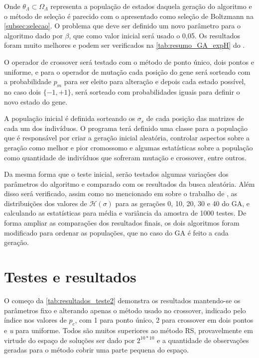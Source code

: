 Onde \(\theta_{\Lambda} \subset \Omega_{\Lambda} \) representa a população de estados daquela geração do algoritmo e o método de seleção é parecido com o apresentado como seleção de Boltzmann na \autoref{subsec:selecao}. O problema que deve ser definido um novo parâmetro para o algoritmo dado por \(\beta \), que como valor inicial será usado o 0,05. Os resultados foram muito melhores e podem ser verificados na \autoref{tab:resumo_GA_expH} do .

O operador de crossover será testado com o método de ponto único, dois pontos e uniforme, e para o operador de mutação cada posição do gene será sorteado com a probabilidade \(p_m\) para ser eleito para alteração e depois cada estado possível, no caso dois \(\{ -1, +1\}\), será sorteado com probabilidades iguais para definir o novo estado do gene.

A população inicial é definida sorteando os \(\sigma_s\) de cada posição das matrizes de cada um dos indivíduos. O programa terá definido uma classe para a população que é responsável por criar a geração inicial aleatória, controlar aspectos sobre a geração como melhor e pior cromossomo e algumas estatísticas sobre a população como quantidade de indivíduos que sofreram mutação e crossover, entre outros. 

Da mesma forma que o teste inicial, serão testados algumas variações dos parâmetros do algoritmo e comparado com os resultados da busca aleatória. Além disso será verificado, assim como no mencionado em  sobre o trabalho de , as distribuições dos valores de \(\mathcal{H}(\sigma)\) para as gerações 0, 10, 20, 30 e 40 do GA, e calculando as estatísticas para média e variância da amostra de 1000 testes. De forma ampliar as comparações dos resultados finais, os dois algoritmos foram modificado para ordenar as populações, que no caso do GA é feito a cada geração.

\section{Testes e resultados}
O começo da \autoref{tab:resultados_teste2} demonstra os resultados mantendo-se os parâmetros fixo e alterando apenas o método usado no crossover, indicado pelo índice nos valores de \(p_c\), com 1 para ponto único, 2 para crossover em dois pontos e \textit{u} para uniforme. Todos são muitos superiores ao método RS, provavelmente em virtude do espaço de soluções ser dado por \(2^{10*10}\) e a quantidade de observações geradas para o método cobrir uma parte pequena do espaço. 

